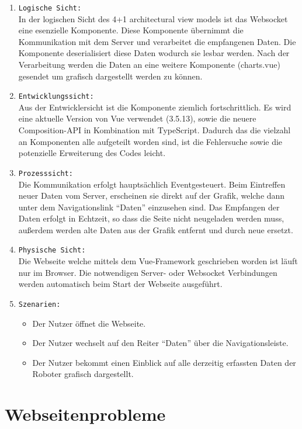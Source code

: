 \begin{enumerate}
  \item \texttt{Logische Sicht:} \\
  In der logischen Sicht des 4+1 architectural view models ist das Websocket eine esenzielle Komponente.
  Diese Komponente übernimmt die Kommunikation mit dem Server und verarbeitet die empfangenen Daten.
  Die Komponente deserialisiert diese Daten wodurch sie lesbar werden. Nach der Verarbeitung werden die Daten an 
  eine weitere Komponente (charts.vue) gesendet um grafisch dargestellt werden zu können.
  \item \texttt{Entwicklungssicht:} \\
  Aus der Entwicklersicht ist die Komponente ziemlich fortschrittlich.
  Es wird eine aktuelle Version von Vue verwendet (3.5.13), sowie die neuere Composition-API in Kombination mit TypeScript.
  Dadurch das die vielzahl an Komponenten alle aufgeteilt worden sind,
  ist die Fehlersuche sowie die potenzielle Erweiterung des Codes leicht.
  \item \texttt{Prozesssicht:} \\
  Die Kommunikation erfolgt hauptsächlich Eventgesteuert. 
  Beim Eintreffen neuer Daten vom Server, erscheinen sie direkt auf der Grafik, 
  welche dann unter dem Navigationslink ``Daten'' einzusehen sind. 
  Das Empfangen der Daten erfolgt in Echtzeit, so dass die Seite nicht neugeladen werden muss, 
  außerdem werden alte Daten aus der Grafik entfernt und durch neue ersetzt.
  \item \texttt{Physische Sicht:} \\
  Die Webseite welche mittels dem Vue-Framework geschrieben worden ist läuft nur im Browser.
  Die notwendigen Server- oder Websocket Verbindungen werden automatisch beim Start der Webseite ausgeführt.
  \item \texttt{Szenarien:} \\
    \begin{itemize}
      \renewcommand{\labelitemi}{$\Rightarrow$}
    \item Der Nutzer öffnet die Webseite.
    \item Der Nutzer wechselt auf den Reiter ``Daten'' über die Navigationsleiste.
    \item Der Nutzer bekommt einen Einblick auf alle derzeitig erfassten Daten der Roboter grafisch dargestellt.
    \end{itemize}
\end{enumerate}

\section{Webseitenprobleme}
\label{subsec:problem_Webseite}

